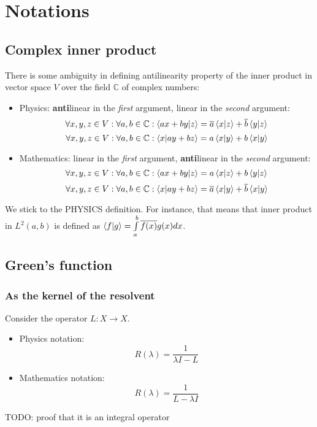\documentclass[12pt, a4paper]{article}
\newcommand{\cconj}[1]{\overline{#1}}
\begin{document}
\section{Notations}

\subsection{Complex inner product}
There is some ambiguity in defining antilinearity property of the inner product in vector space $V$ over the field $\mathbb{C}$ of complex numbers:

\begin{itemize}
\item Physics: \textbf{anti}linear in the \textit{first} argument, linear in the \textit{second} argument:
\[
\forall x, y, z \in V: \forall a, b \in \mathbb{C}: \ip{ax + by}{z} = \cconj{a} \ip{x}{z} + \cconj{b} \ip{y}{z}
\]
\[
\forall x, y, z \in V: \forall a, b \in \mathbb{C}: \ip{x}{ay + bz} = a \ip{x}{y} + b \ip{x}{y}
\]
\item Mathematics: linear in the \textit{first} argument, \textbf{anti}linear in the \textit{second} argument:
\[
\forall x, y, z \in V: \forall a, b \in \mathbb{C}: \ip{ax + by}{z} = a \ip{x}{z} + b \ip{y}{z}
\]
\[
\forall x, y, z \in V: \forall a, b \in \mathbb{C}: \ip{x}{ay + bz} = \cconj{a} \ip{x}{y} + \cconj{b} \ip{x}{y}
\]
\end{itemize}

We stick to the PHYSICS definition. For instance, that means that inner product in $L^2(a, b)$ is defined as $\ip{f}{g} = \int\limits_a^b \cconj{f(x)} g(x) dx$.


\subsection{Green's function}

\subsubsection{As the kernel of the resolvent}
Consider the operator $L: X \to X$.

\begin{itemize}
\item Physics notation: $$R(\lambda) = \frac{1}{\lambda I - L}$$
\item Mathematics notation: $$R(\lambda) = \frac{1}{L - \lambda I}$$
\end{itemize} 

TODO: proof that it is an integral operator
\end{document}
